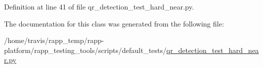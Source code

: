 Definition at line 41 of file qr\-\_\-detection\-\_\-test\-\_\-hard\-\_\-near.\-py.



The documentation for this class was generated from the following file\-:\begin{DoxyCompactItemize}
\item 
/home/travis/rapp\-\_\-temp/rapp-\/platform/rapp\-\_\-testing\-\_\-tools/scripts/default\-\_\-tests/\hyperlink{qr__detection__test__hard__near_8py}{qr\-\_\-detection\-\_\-test\-\_\-hard\-\_\-near.\-py}\end{DoxyCompactItemize}
